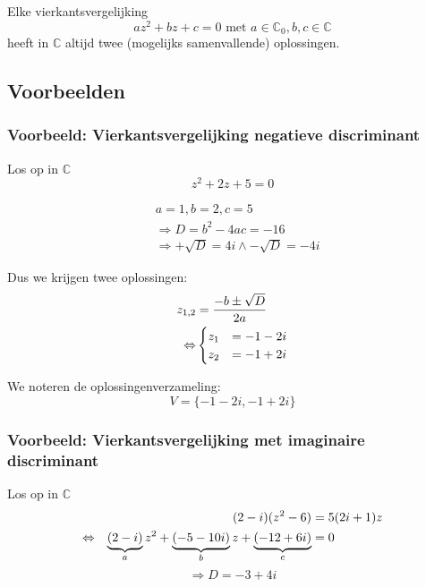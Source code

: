 \documentclass[12pt,twoside,a4paper]{article}
\begin{document}
\begin{mdframed}
Elke vierkantsvergelijking
\[az^2+bz+c=0 \text{ met } a\in\mathbb{C}_0, b,c\in\mathbb{C}\]
heeft in $\mathbb{C}$ altijd twee (mogelijks samenvallende) oplossingen.
\end{mdframed}

\subsection{Voorbeelden}

\subsubsection*{Voorbeeld: Vierkantsvergelijking negatieve discriminant}

Los op in $\mathbb{C}$
$$z^2 + 2z + 5 = 0$$

\begin{align*}
  & a=1, b=2, c=5\\
  & \Rightarrow  D = b^2 - 4ac = -16\\
  & \Rightarrow  +\sqrt{D} = 4i \wedge -\sqrt{D}=-4i
\end{align*}

Dus we krijgen twee oplossingen:
\begin{align*}
  z_{1,2} &= \dfrac{-b \pm \sqrt{D}}{2a}\\
  \Leftrightarrow & \begin{cases}z_1 &= -1 - 2i\\z_2 &= -1 + 2i\end{cases}
\end{align*}

We noteren de oplossingenverzameling:
$$V=\{ -1-2i, -1+2i \}$$

\subsubsection*{Voorbeeld: Vierkantsvergelijking met imaginaire discriminant}

Los op in $\mathbb{C}$
\begin{align*}
       && (2-i)(z^2-6) &= 5(2i+1)z\\
  \Leftrightarrow && \underbrace{(2-i)}_a z^2 + \underbrace{(-5-10i)}_b z + \underbrace{(-12+6i)}_c &= 0
\end{align*}
\[\Rightarrow D = -3+4i\]
\end{document}
